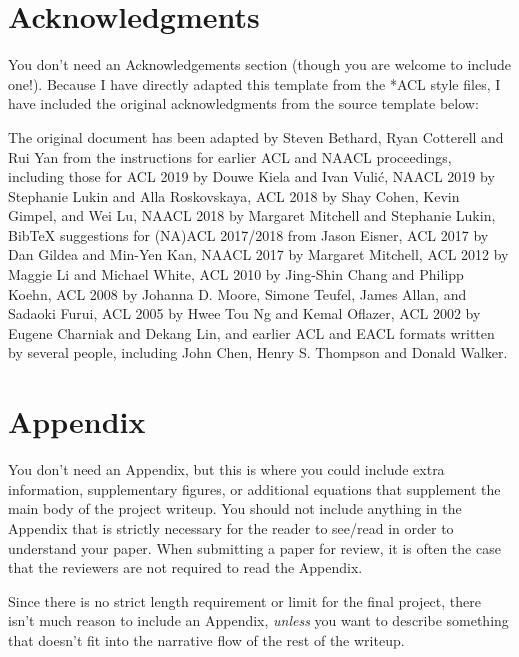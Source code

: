 \documentclass[11pt]{article}
\begin{document}
\section*{Acknowledgments}
You don't need an Acknowledgements section (though you are welcome to include one!). Because I have directly adapted this template from the *ACL style files, I have included the original acknowledgments from the source template below: 

The original document has been adapted
by Steven Bethard, Ryan Cotterell and Rui Yan
from the instructions for earlier ACL and NAACL proceedings, including those for
ACL 2019 by Douwe Kiela and Ivan Vuli\'{c},
NAACL 2019 by Stephanie Lukin and Alla Roskovskaya,
ACL 2018 by Shay Cohen, Kevin Gimpel, and Wei Lu,
NAACL 2018 by Margaret Mitchell and Stephanie Lukin,
Bib\TeX{} suggestions for (NA)ACL 2017/2018 from Jason Eisner,
ACL 2017 by Dan Gildea and Min-Yen Kan,
NAACL 2017 by Margaret Mitchell,
ACL 2012 by Maggie Li and Michael White,
ACL 2010 by Jing-Shin Chang and Philipp Koehn,
ACL 2008 by Johanna D. Moore, Simone Teufel, James Allan, and Sadaoki Furui,
ACL 2005 by Hwee Tou Ng and Kemal Oflazer,
ACL 2002 by Eugene Charniak and Dekang Lin,
and earlier ACL and EACL formats written by several people, including
John Chen, Henry S. Thompson and Donald Walker.



\appendix






\section{Appendix}
\label{sec:appendix}
You don't need an Appendix, but this is where you could include extra information, supplementary figures, or additional equations that supplement the main body of the project writeup. You should not include anything in the Appendix that is strictly necessary for the reader to see/read in order to understand your paper. When submitting a paper for review, it is often the case that the reviewers are not required to read the Appendix. 

Since there is no strict length requirement or limit for the final project, there isn't much reason to include an Appendix, \textit{unless} you want to describe something that doesn't fit into the narrative flow of the rest of the writeup.
\end{document}
